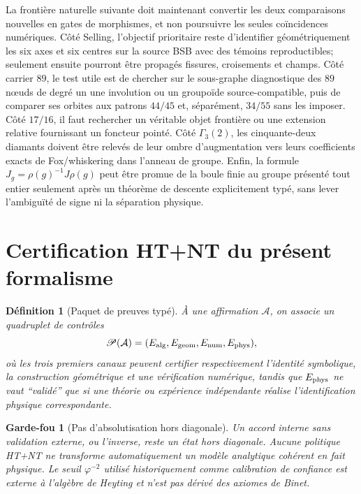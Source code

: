\documentclass[11pt,a4paper]{article}
\newtheorem{definition}[theorem]{Définition}
\newtheorem{guardrail}[theorem]{Garde-fou}
\newcommand{\ph}{\varphi}
\begin{document}
La frontière naturelle suivante doit maintenant convertir les deux comparaisons nouvelles en gates de morphismes, et non poursuivre les seules coïncidences numériques. Côté Selling, l'objectif prioritaire reste d'identifier géométriquement les six axes et six centres sur la source BSB avec des témoins reproductibles; seulement ensuite pourront être propagés fissures, croisements et champs. Côté carrier $89$, le test utile est de chercher sur le sous-graphe diagnostique des $89$ nœuds de degré un une involution ou un groupoïde source-compatible, puis de comparer ses orbites aux patrons $44/45$ et, séparément, $34/55$ sans les imposer. Côté $17/16$, il faut rechercher un véritable objet frontière ou une extension relative fournissant un foncteur pointé. Côté $\Gamma_3(2)$, les cinquante-deux diamants doivent être relevés de leur ombre d'augmentation vers leurs coefficients exacts de Fox/whiskering dans l'anneau de groupe. Enfin, la formule $J_g=\rho(g)^{-1}J\rho(g)$ peut être promue de la boule finie au groupe présenté tout entier seulement après un théorème de descente explicitement typé, sans lever l'ambiguïté de signe ni la séparation physique.


\section{Certification HT+NT du présent formalisme}

\begin{definition}[Paquet de preuves typé]
À une affirmation $\mathcal A$, on associe un quadruplet de contrôles
\[
 \mathscr P(\mathcal A)=(E_{\rm alg},E_{\rm geom},E_{\rm num},E_{\rm phys}),
\]
où les trois premiers canaux peuvent certifier respectivement l'identité symbolique, la construction géométrique et une vérification numérique, tandis que $E_{\rm phys}$ ne vaut ``validé'' que si une théorie ou expérience indépendante réalise l'identification physique correspondante.
\end{definition}

\begin{guardrail}[Pas d'absolutisation hors diagonale]
Un accord interne sans validation externe, ou l'inverse, reste un état hors diagonale. Aucune politique HT+NT ne transforme automatiquement un modèle analytique cohérent en fait physique. Le seuil $\ph^{-2}$ utilisé historiquement comme calibration de confiance est externe à l'algèbre de Heyting et n'est pas dérivé des axiomes de Binet.
\end{guardrail}
\end{document}
